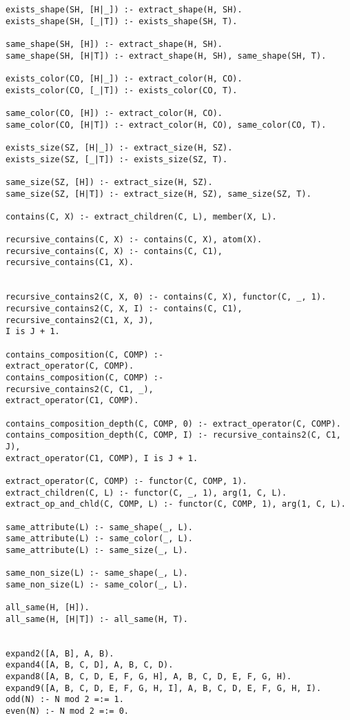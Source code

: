 \begin{verbatim}
exists_shape(SH, [H|_]) :- extract_shape(H, SH).
exists_shape(SH, [_|T]) :- exists_shape(SH, T).

same_shape(SH, [H]) :- extract_shape(H, SH).
same_shape(SH, [H|T]) :- extract_shape(H, SH), same_shape(SH, T).

exists_color(CO, [H|_]) :- extract_color(H, CO).
exists_color(CO, [_|T]) :- exists_color(CO, T).

same_color(CO, [H]) :- extract_color(H, CO).
same_color(CO, [H|T]) :- extract_color(H, CO), same_color(CO, T).

exists_size(SZ, [H|_]) :- extract_size(H, SZ).
exists_size(SZ, [_|T]) :- exists_size(SZ, T).

same_size(SZ, [H]) :- extract_size(H, SZ).
same_size(SZ, [H|T]) :- extract_size(H, SZ), same_size(SZ, T).

contains(C, X) :- extract_children(C, L), member(X, L).

recursive_contains(C, X) :- contains(C, X), atom(X).
recursive_contains(C, X) :- contains(C, C1), 
recursive_contains(C1, X).


recursive_contains2(C, X, 0) :- contains(C, X), functor(C, _, 1).
recursive_contains2(C, X, I) :- contains(C, C1), 
recursive_contains2(C1, X, J), 
I is J + 1.

contains_composition(C, COMP) :- 
extract_operator(C, COMP).
contains_composition(C, COMP) :- 
recursive_contains2(C, C1, _),
extract_operator(C1, COMP).

contains_composition_depth(C, COMP, 0) :- extract_operator(C, COMP).
contains_composition_depth(C, COMP, I) :- recursive_contains2(C, C1, J), 
extract_operator(C1, COMP), I is J + 1.

extract_operator(C, COMP) :- functor(C, COMP, 1).
extract_children(C, L) :- functor(C, _, 1), arg(1, C, L).
extract_op_and_chld(C, COMP, L) :- functor(C, COMP, 1), arg(1, C, L).

same_attribute(L) :- same_shape(_, L).
same_attribute(L) :- same_color(_, L).
same_attribute(L) :- same_size(_, L).

same_non_size(L) :- same_shape(_, L).
same_non_size(L) :- same_color(_, L).

all_same(H, [H]).
all_same(H, [H|T]) :- all_same(H, T).


expand2([A, B], A, B).
expand4([A, B, C, D], A, B, C, D).
expand8([A, B, C, D, E, F, G, H], A, B, C, D, E, F, G, H).
expand9([A, B, C, D, E, F, G, H, I], A, B, C, D, E, F, G, H, I).
odd(N) :- N mod 2 =:= 1.
even(N) :- N mod 2 =:= 0.



\end{verbatim}
